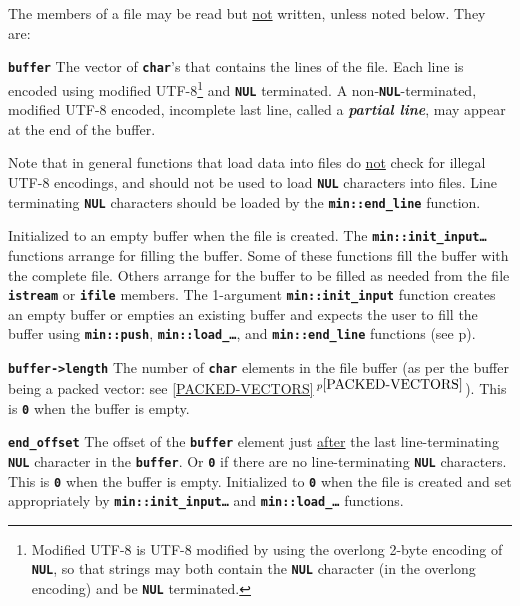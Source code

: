 \documentclass[12pt]{article}
\makeatletter
\newcommand{\TT}[1]{{\tt \bfseries #1}}
\newcommand{\key}[1]{{\bf \em #1}\index{#1}}
\newcommand{\ttmkey}[2]{\TT{#1}\index{#1@{\tt #1}!#2}}
\newcommand{\itemref}[1]{\ref{#1}$\,^{p\pageref{#1}}$}
\newcommand{\pagref}[1]{p\pageref{#1}}
\newcommand{\EOL}{\penalty \exhyphenpenalty}
\newenvironment{itemlist}[1][1.2in]%
	{\begin{list}{}{\setlength{\labelwidth}{#1}%
		        \setlength{\leftmargin}{\labelwidth}%
		        \addtolength{\leftmargin}{+0.2in}%
		        \renewcommand{\makelabel}[1]{##1\hfill}}}%
	{\end{list}}
\makeatother
\begin{document}
The members of a file may be read but \underline{not} written, unless
noted below.  They are:

\begin{itemlist}[1.4in]

\item[\ttmkey{buffer}{in {\tt min::file}}]
The vector of \TT{char}'s that contains the lines of the file.  Each
line is encoded using modified UTF-8\footnote{Modified UTF-8 is UTF-8
modified by using the overlong 2-byte encoding of \TT{NUL}, so that strings
may both contain the \TT{NUL} character (in the overlong encoding)
and be \TT{NUL} terminated.}
and \TT{NUL} terminated.
A non-\TT{NUL}-terminated, modified UTF-8
encoded, incomplete
last line, called a \key{partial line}\label{PARTIAL-LINE},
may appear at the end of the buffer.

Note that in general functions that load data into files do \underline{not}
check for illegal UTF-8 encodings, and should not be used to load
\TT{NUL} characters into files.  Line terminating
\TT{NUL} characters should be loaded by the \TT{min::end\_line} function.

Initialized to an empty buffer when the file is created.  The
\TT{min::\EOL init\_\EOL input\ldots} functions arrange for filling
the buffer.
Some of these functions fill the buffer with the complete file.
Others arrange for the buffer to be filled as needed from
the file \TT{istream} or \TT{ifile} members.  The 1-argument
\TT{min::\EOL init\_\EOL input} function creates an empty buffer
or empties an existing buffer and expects the user to fill the
buffer using \TT{min::\EOL push}, \TT{min::load\_\ldots},
and \TT{min::\EOL end\_\EOL line}
functions (see \pagref{WRITING-FILE-BUFFER}).

\item[\ttmkey{buffer->length}{in {\tt min::file}}]
The number of \TT{char} elements in the file buffer
(as per the buffer being a packed vector: see \itemref{PACKED-VECTORS}).
This is \TT{0} when the buffer is empty.

\item[\ttmkey{end\_\EOL offset}{in {\tt min::file}}]
The offset of the \TT{buffer} element just \underline{after} the last
line-terminating \TT{NUL} character in the \TT{buffer}.  Or \TT{0} if there
are no line-terminating \TT{NUL} characters.
This is \TT{0} when the buffer is empty.
Initialized to \TT{0} when the file is created and set appropriately by
\TT{min::\EOL init\_\EOL input\ldots}
and \TT{min::\EOL load\_\ldots}
functions.


\end{itemlist}
\end{document}
